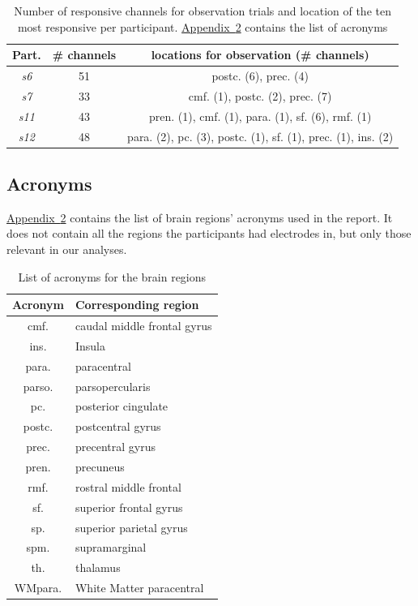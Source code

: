 \documentclass[10pt,conference,compsocconf]{IEEEtran}
\newcommand{\aref}[1]{\hyperref[#1]{Appendix~\ref*{#1}}}
\begin{document}
\begin{table}[h!]
    \centering
    \begin{tabular}{| c | c | c |}
        \hline
        Part. & \# channels & locations for observation (\# channels) \\
        \hline
        \textit{s6} & 51 & postc. (6), prec. (4)\\
        \hline
        \textit{s7} & 33 & cmf. (1), postc. (2), prec. (7) \\
        \hline
        \textit{s11} & 43 & pren. (1), cmf. (1), para. (1), sf. (6), rmf. (1)\\
        \hline
        \textit{s12} & 48 & para. (2), pc. (3), postc. (1), sf. (1), prec. (1), ins. (2)\\
        \hline
    \end{tabular}
    \caption{Number of responsive channels for observation trials and location of the ten most responsive per participant. \aref{apptab:acronyms} contains the list of acronyms}
    \label{apptab:obsmovchannellocations}
\end{table}

\subsection{Acronyms}
\aref{apptab:acronyms} contains the list of brain regions' acronyms used in the report. It does not contain all the regions the participants had electrodes in, but only those relevant in our analyses.

\begin{table}[h!]
    \centering
    \begin{tabular}{| c | l |}
        \hline
        Acronym & Corresponding region \\
        \hline
        cmf. & caudal middle frontal gyrus \\
        ins. & Insula \\
        para. & paracentral \\
        parso. & parsopercularis \\
        pc. & posterior cingulate \\
        postc. & postcentral gyrus \\
        prec. & precentral gyrus \\
	      pren. & precuneus \\
        rmf. & rostral middle frontal \\
        sf. & superior frontal gyrus \\
	      sp. & superior parietal gyrus \\
	      spm. & supramarginal \\
	      th. & thalamus \\
        WMpara. & White Matter paracentral \\
        \hline
    \end{tabular}
    \caption{List of acronyms for the brain regions}
    \label{apptab:acronyms}
\end{table}
\end{document}
